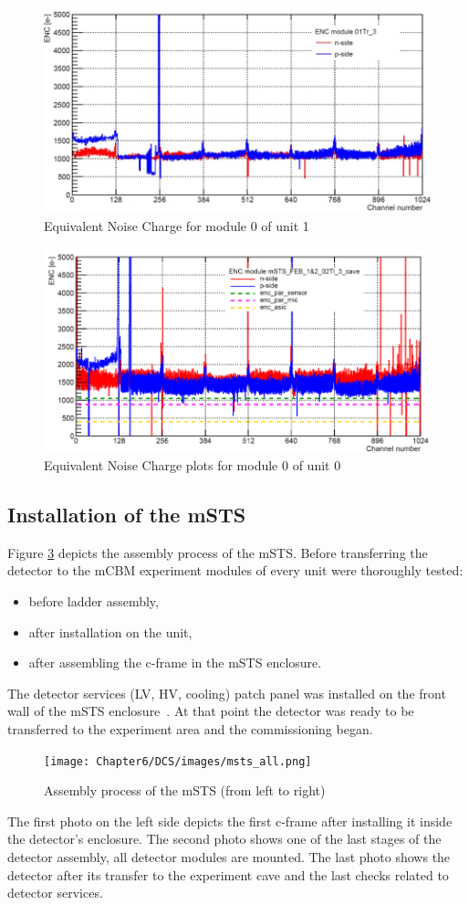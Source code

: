 \begin{figure}[h!]
\centering
\includegraphics[width=0.6\columnwidth]{Chapter6/DCS/images/U0M1_ENC.jpg}
\caption{Equivalent Noise Charge for module 0 of unit 1~\cite{RodriguezRodriguez2020}}
\label{fig_msts_ENC1}
\end{figure}

\begin{figure}[h!]
\centering
\includegraphics[width=0.6\columnwidth]{Chapter6/DCS/images/U1M1_ENC.png}
\caption{Equivalent Noise Charge plots for module 0 of unit 0~\cite{RodriguezRodriguez2020}}
\label{fig_msts_ENC2}
\end{figure}
\newpage
\subsection{Installation of the mSTS}
Figure \ref{fig_msts_state} depicts the assembly process of the \gls{mSTS}. Before transferring the detector to the \gls{mCBM} experiment modules of every unit were thoroughly tested:
\begin{itemize}
    \item before ladder assembly,
    \item after installation on the unit,
    \item after assembling the c-frame in the mSTS enclosure.
\end{itemize}
The detector services (\gls{LV}, \gls{HV}, cooling) patch panel was installed on the front wall of the \gls{mSTS} enclosure~\cite{tekli1}. At that point the detector was ready to be transferred to the experiment area and the commissioning began.

\begin{figure}[h!]
\centering
\texttt{[image: Chapter6/DCS/images/msts\_all.png]}
\caption{Assembly process of the \gls{mSTS} (from left to right)}
\label{fig_msts_state}
\end{figure}
 The first photo on the left side depicts the first c-frame after installing it inside the detector's enclosure. The second photo shows one of the last stages of the detector assembly, all detector modules are mounted. The last photo shows the detector after its transfer to the experiment cave and the last checks related to detector services. %

